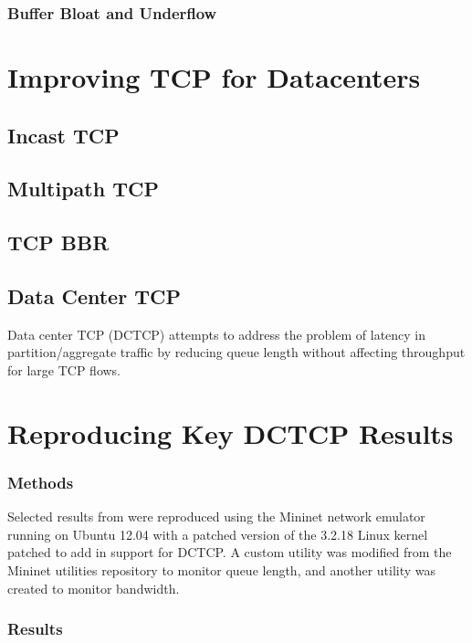 \subsubsection{Buffer Bloat and Underflow}

\section{Improving TCP for Datacenters}

\subsection{Incast TCP}

\subsection{Multipath TCP}

\subsection{TCP BBR}

\subsection{Data Center TCP}

Data center TCP (DCTCP) attempts to address the problem of latency in partition/aggregate traffic by reducing queue length without affecting throughput for large TCP flows.

\section{Reproducing Key DCTCP Results}

\subsubsection{Methods}

Selected results from \cite{alizadeh_data_2010} were reproduced using the Mininet network emulator running on Ubuntu 12.04 with a patched version of the 3.2.18 Linux kernel patched to add in support for DCTCP. A custom utility was modified from the Mininet utilities repository to monitor queue length, and another utility was created to monitor bandwidth. 

\subsubsection{Results}

